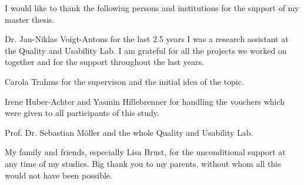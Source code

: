 \thispagestyle{empty}
\vspace*{3cm}

I would like to thank the following persons and institutions for the support of my master thesis.

Dr. Jan-Niklas Voigt-Antons for the last 2.5 years I was a research assistant at the Quality and Usability Lab. I am grateful for all the projects we worked on together and for the support throughout the last years.

Carola Trahms for the supervison and the initial idea of the topic.

Irene Huber-Achter and Yasmin Hillebrenner for handling the vouchers which were given to all participants of this study.

Prof. Dr. Sebastian M\"oller and the whole Quality and Usability Lab.

My family and friends, especially Lisa Brust, for the unconditional support at any time of my studies. Big thank you to my parents, without whom all this would not have been possible.

